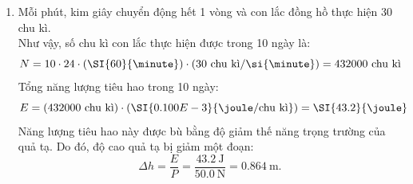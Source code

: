 \begin{enumerate}[label=\bfseries Bài \arabic*:]
{\begin{enumerate}[label=\alph*)]
	\item Mỗi phút, kim giây chuyển động hết 1 vòng và con lắc đồng hồ thực hiện 30 chu kì.\\
	Như vậy, số chu kì con lắc thực hiện được trong 10 ngày là:
	$$N=10 \cdot24\cdot\left(\SI{60}{\minute}\right)\cdot\left(30\ \text{chu kì/\si{\minute}}\right)=432000\ \text{chu kì}$$
	Tổng năng lượng tiêu hao trong 10 ngày:
	$$E=\left(432000\ \text{chu kì}\right)\cdot\left(\SI{0.100E-3}{\joule/\text{chu kì}}\right)=\SI{43.2}{\joule}$$
	Năng lượng tiêu hao này được bù bằng độ giảm thế năng trọng trường của quả tạ. Do đó, độ cao quả tạ bị giảm một đoạn:
	$$\Delta h=\dfrac{E}{P}=\dfrac{\SI{43.2}{\joule}}{\SI{50.0}{\newton}}=\SI{0.864}{\meter}.$$
	
\end{enumerate}

}
\end{enumerate}